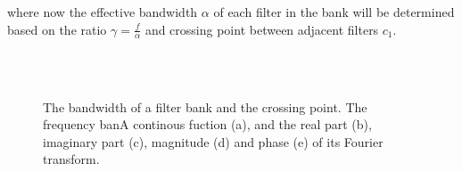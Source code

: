 where now the effective bandwidth $\alpha$ of each filter in the bank will be determined based on the ratio $\gamma = \frac{f}{\alpha}$ and crossing point between adjacent filters $c_1$.


\begin{figure}
\centering
{} \\%
\\%
\caption{The bandwidth of a filter bank and the crossing point. The frequency banA continous fuction (a), and the real part (b), imaginary part (c), magnitude (d) and phase (e) of its Fourier transform.}\label{fig:sin_signal_fourier_comp}
\end{figure}







